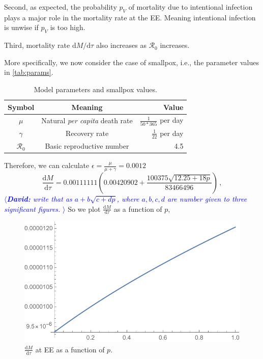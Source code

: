 \documentclass[12pt]{article}
\newcommand\dbyd[2]{\frac{\mathrm d{#1}}{\mathrm d{#2}}}
\newcommand\dsided[2]{{\mathrm d{#1}}/{\mathrm d{#2}}}
\newcommand{\R}{\mathcal{R}}
\newcommand{\david}[1]{\textcolor{blue}{$\langle${\slshape{\bfseries David:} #1 }$\rangle$}}
\newcommand{\pmV}{p_{V}}
\begin{document}
Second, as expected, the probability $\pmV$ of mortality due to intentional infection plays a major role in the mortality rate at the EE. Meaning intentional infection is unwise if $\pmV$ is too high. 

Third, mortality rate $\dsided{M}{\tau}$ also increases as $\R_0$ increases. 

More specifically, we now consider the case of smallpox, i.e., the parameter values in \autoref{tab:params}.

\begin{table}[H]
\begin{center}
\caption{Model parameters and smallpox values.}
\label{tab:params}
\smallskip
\begin{tabular}{c|c|r}
{\bfseries Symbol} & {\bfseries Meaning} & {\bfseries Value} \\\hline
$\mu$ & Natural \emph{per capita} death rate & $\frac{1}{50*365}$ per day \\
$\gamma$ & Recovery rate & $\frac{1}{22}$ per day \\
$\R_0$ & Basic reproductive number & 4.5
\end{tabular}
\end{center}
\end{table}

Therefore, we can calculate $\epsilon=\frac{\mu}{\mu+\gamma}=0.0012$
\begin{equation}
\dbyd{M}{\tau}=0.00111111(0.00420902+\frac{100375\sqrt{12.25+18p}}{83466496})\,,
\end{equation}
\david{write that as $a + b\sqrt{c + d p}$, where $a,b,c,d$ are number given to three significant figures.}
So we plot $\dbyd{M}{\tau}$ as a function of $p$,
\begin{figure}[H]
  \centering
  \includegraphics[width=1\textwidth]{Figures/Plot_dmdt_as_f_of_p.pdf}
  \caption{$\dbyd{M}{\tau}$ at EE as a function of $p$.}
\label{fig:dMdt}
\end{figure}
\end{document}
